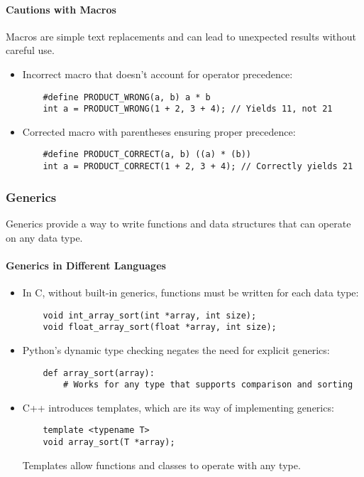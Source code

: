 \documentclass[12pt]{article}
\begin{document}
\paragraph{Cautions with Macros}
Macros are simple text replacements and can lead to unexpected results without careful use.
\begin{itemize}
    \item Incorrect macro that doesn't account for operator precedence:
    \begin{verbatim}
    #define PRODUCT_WRONG(a, b) a * b
    int a = PRODUCT_WRONG(1 + 2, 3 + 4); // Yields 11, not 21
    \end{verbatim}
    
    \item Corrected macro with parentheses ensuring proper precedence:
    \begin{verbatim}
    #define PRODUCT_CORRECT(a, b) ((a) * (b))
    int a = PRODUCT_CORRECT(1 + 2, 3 + 4); // Correctly yields 21
    \end{verbatim}
\end{itemize}

\subsubsection{Generics}
Generics provide a way to write functions and data structures that can operate on any data type.

\paragraph{Generics in Different Languages}
\begin{itemize}
    \item In C, without built-in generics, functions must be written for each data type:
    \begin{verbatim}
    void int_array_sort(int *array, int size);
    void float_array_sort(float *array, int size);
    \end{verbatim}

    \item Python's dynamic type checking negates the need for explicit generics:
    \begin{verbatim}
    def array_sort(array):
        # Works for any type that supports comparison and sorting
    \end{verbatim}

    \item C++ introduces templates, which are its way of implementing generics:
    \begin{verbatim}
    template <typename T>
    void array_sort(T *array);
    \end{verbatim}
    Templates allow functions and classes to operate with any type.
\end{itemize}
\end{document}
